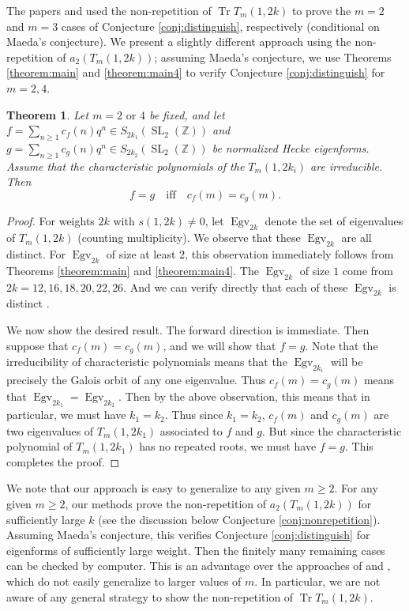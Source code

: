 \documentclass[11pt,letterpaper,reqno]{amsart}
\numberwithin{figure}{section}
\numberwithin{table}{section}
\theoremstyle{definition}
\theoremstyle{plain}
\newcommand{\ZZ}{\mathbb{Z}}
\newtheorem{theorem}{Theorem}[section]
\theoremstyle{definition}
\theoremstyle{definition}
\theoremstyle{remark}
\numberwithin{equation}{section}
\DeclareMathOperator{\SL}{SL}
\DeclareMathOperator{\Egv}{Egv}
\DeclareMathOperator{\Tr}{Tr}
\begin{document}
The papers \cite{Vilardi2018} and \cite{xue-zhu} used the non-repetition of $\Tr T_m(1, 2k)$ to prove the $m=2$ and $m=3$ cases of Conjecture \ref{conj:distinguish}, respectively (conditional on Maeda's conjecture). 
We present a slightly different approach using the non-repetition of $a_2(T_m(1,2k))$; assuming Maeda's conjecture, we use Theorems \ref{theorem:main} and \ref{theorem:main4} to verify Conjecture \ref{conj:distinguish} for $m=2,4$.



{
\renewcommand{\thetheorem}{\ref{theorem:distinguish-eigenforms}}
\begin{theorem} 
    Let $m = 2 \text{ or }4$ be fixed, and let $f=\sum_{n\ge1} c_f(n) q^n\in S_{2k_1}(\SL_2(\ZZ))$ and $g=\sum_{n\ge1} c_g(n) q^n\in S_{2k_2}(\SL_2(\ZZ))$ be normalized Hecke eigenforms. Assume that the characteristic polynomials of the $T_m(1,2k_i)$ are irreducible. Then
    \begin{equation}
    f=g \quad \text{iff} \quad c_f(m) = c_g(m).
    \end{equation}
\end{theorem}
\addtocounter{theorem}{-1}
}

\begin{proof}
    For weights $2k$ with $s(1,2k) \neq 0$, let $\Egv_{2k}$ denote the set of eigenvalues of $T_m(1,2k)$ (counting multiplicity). We observe that these $\Egv_{2k}$ are all distinct.
    For $\Egv_{2k}$ of size at least $2$, this observation immediately follows from Theorems \ref{theorem:main} and \ref{theorem:main4}.
    The $\Egv_{2k}$ of size $1$ come from $2k = 12,16,18,20,22,26$. And we can verify directly that each of these $\Egv_{2k}$ is distinct \cite{ross-code}.
    
    We now show the desired result. The forward direction is immediate.
    Then suppose that $c_f(m) = c_g(m)$, and we will show that $f=g$. Note that the irreducibility of characteristic polynomials means that the $\Egv_{2k_i}$ will be precisely the Galois orbit of any one eigenvalue. Thus $c_f(m) = c_g(m)$ means that $\Egv_{2k_1} = \Egv_{2k_2}$. Then by the above observation, this means that in particular, we must have $k_1 = k_2$. 
    Thus since $k_1=k_2$, $c_f(m)$ and $c_g(m)$ are two eigenvalues of $T_m(1,2k_1)$ associated to $f$ and $g$. But since the characteristic polynomial of $T_m(1,2k_1)$ has no repeated roots, we must have $f=g$. This completes the proof.
\end{proof}


We note that our approach is easy to generalize to any given $m \geq 2$. For any given $m \ge 2$, our methods prove the non-repetition of $a_2(T_m(1,2k))$ for sufficiently large $k$ (see the discussion below Conjecture \ref{conj:nonrepetition}). Assuming Maeda's conjecture, this verifies Conjecture \ref{conj:distinguish} for eigenforms of sufficiently large weight. Then the finitely many remaining cases can be checked by computer.
This is an advantage over the approaches of \cite{Vilardi2018} and \cite{xue-zhu}, which do not easily generalize to larger values of $m$. In particular, we are not aware of any general strategy to show the non-repetition of $\Tr T_m(1,2k)$.
\end{document}
